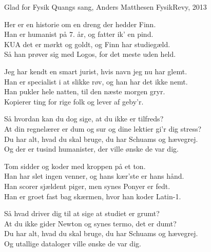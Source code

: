 \begin{song}{Glad for Fysik}
  {} %
  {Quangs sang, Anders Matthesen} %
  {} %
  {FysikRevy, 2013} %
  {\NotCCLIed} %

  \begin{SBVerse}
	Her er en historie om en dreng der hedder Finn.\\
	Han er humanist på 7. år, og fatter ik' en pind.\\
	KUA det er mørkt og goldt, og Finn har studiegæld.\\
	Så han prøver sig med Logos, for det meste uden held.
  \end{SBVerse}

  \begin{SBVerse}
	Jeg har kendt en smart jurist, hvis navn jeg nu har glemt.\\
	Han er specialist i at slikke røv, og han har det ikke nemt.\\
	Han pukler hele natten, til den næste morgen gryr.\\
	Kopierer ting for rige folk og lever af geby'r.
  \end{SBVerse}

  \begin{SBChorus}
	Så hvordan kan du dog sige, at du ikke er tilfreds?\\
	At din regnelærer er dum og sur og dine lektier gi'r dig stress?\\
	Du har alt, hvad du skal bruge, du har Schuams og hævegrej.\\
	Og der er tusind humanister, der ville ønske de var dig.
  \end{SBChorus}

  \begin{SBVerse}
	Tom sidder og koder med kroppen på et ton.\\
	Han har slet ingen venner, og hans kær'ste er hans hånd.\\
	Han scorer sjældent piger, men synes Ponyer er fedt.\\
	Han er groet fast bag skærmen, hvor han koder Latin-1.
  \end{SBVerse}

  \begin{SBChorus}
	Så hvad driver dig til at sige at studiet er grumt?\\
	At du ikke gider Newton og synes termo, det er dumt?\\
	Du har alt, hvad du skal bruge, du har Schuams og hævegrej.\\
	Og utallige dataloger ville ønske de var dig.
  \end{SBChorus}
\end{song}